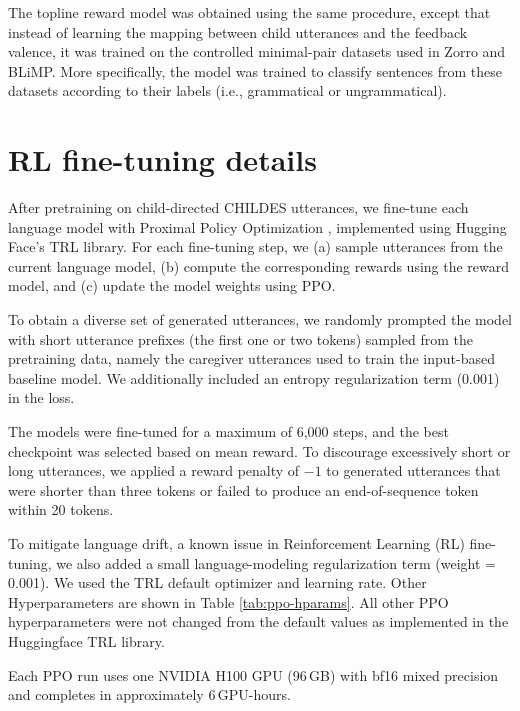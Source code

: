 The topline reward model was obtained using the same procedure, except that instead of learning the mapping between child utterances and the feedback valence, it was trained on the controlled minimal-pair datasets used in Zorro and BLiMP. More specifically, the model was trained to classify sentences from these datasets according to their labels (i.e., grammatical or ungrammatical).

\section{RL fine-tuning details}
\label{sec:rlhf_ppo}

After pretraining on child-directed CHILDES utterances, we fine-tune each language model with Proximal Policy Optimization \citep[PPO;][]{schulman_proximal_2017}, implemented using Hugging Face’s TRL library.
For each fine-tuning step, we (a) sample utterances from the current language model, (b) compute the corresponding rewards using the reward model, and (c) update the model weights using PPO.

To obtain a diverse set of generated utterances, we randomly prompted the model with short utterance prefixes (the first one or two tokens) sampled from the pretraining data, namely the caregiver utterances used to train the input-based baseline model.
We additionally included an entropy regularization term (0.001) in the loss. 

The models were fine-tuned for a maximum of 6,000 steps, and the best checkpoint was selected based on mean reward. To discourage excessively short or long utterances, we applied a reward penalty of $-1$ to generated utterances that were shorter than three tokens or failed to produce an end-of-sequence token within 20 tokens.

To mitigate language drift, a known issue in Reinforcement Learning (RL) fine-tuning, we also added a small language-modeling regularization term (weight = 0.001). We used the TRL default optimizer and learning rate. Other Hyperparameters are shown in Table \ref{tab:ppo-hparams}. All other PPO hyperparameters were not changed from the default values as implemented in the Huggingface TRL library.


Each PPO run uses one NVIDIA H100 GPU (96\,GB) with bf16 mixed precision and completes in approximately \textsc{6}\,GPU-hours.


